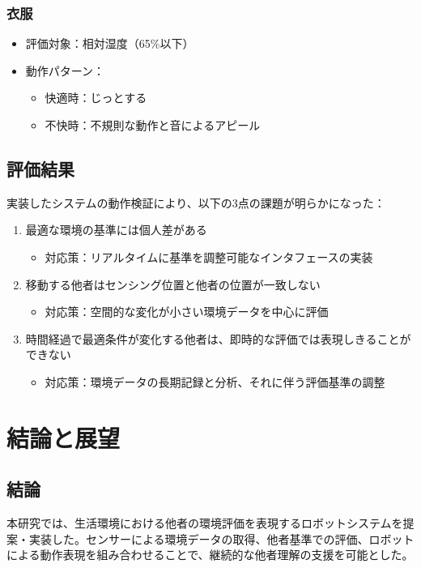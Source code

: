 \documentclass{cuxarticle}
\begin{document}
\subsection{衣服}\cite{--クローゼ}
\begin{itemize}
  \item 評価対象：相対湿度（65\%以下）
  \item 動作パターン：
    \begin{itemize}
      \item 快適時：じっとする
      \item 不快時：不規則な動作と音によるアピール
    \end{itemize}
\end{itemize}

\section{評価結果}
実装したシステムの動作検証により、以下の3点の課題が明らかになった：

\begin{enumerate}
  \item 最適な環境の基準には個人差がある
    \begin{itemize}
      \item 対応策：リアルタイムに基準を調整可能なインタフェースの実装
    \end{itemize}

  \item 移動する他者はセンシング位置と他者の位置が一致しない
    \begin{itemize}
      \item 対応策：空間的な変化が小さい環境データを中心に評価
    \end{itemize}

  \item 時間経過で最適条件が変化する他者は、即時的な評価では表現しきることができない
    \begin{itemize}
      \item 対応策：環境データの長期記録と分析、それに伴う評価基準の調整
    \end{itemize}
\end{enumerate}

\chapter{結論と展望}

\section{結論}
本研究では、生活環境における他者の環境評価を表現するロボットシステムを提案・実装した。センサーによる環境データの取得、他者基準での評価、ロボットによる動作表現を組み合わせることで、継続的な他者理解の支援を可能とした。
\end{document}

